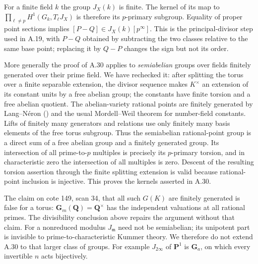 For a finite field $k$ the group $J_X(k)$ is finite. The kernel
of its map to $\prod_{\ell\ne p}H^1(G_k,T_\ell J_X)$ is therefore
its $p$-primary subgroup. Equality of proper point sections
implies $[P-Q]\in J_X(k)[p^\infty]$. This is the principal-divisor
step used in A.19, with $P-Q$ obtained by subtracting the two
classes relative to the same base point; replacing it by $Q-P$
changes the sign but not its order.

More generally the proof of A.30 applies to \emph{semiabelian}
groups over fields finitely generated over their prime field.
We have rechecked it: after splitting the torus over a finite
separable extension, the divisor sequence makes $K^\times$
an extension of its constant units by a free abelian group;
the constants have finite torsion and a free abelian quotient.
The abelian-variety rational points are finitely generated by
Lang--N\'eron (\citealt[Theorem 2.1]{Conrad2006}) and the usual
Mordell--Weil theorem for number-field constants. Lifts of finitely
many generators and relations use only finitely many basis
elements of the free torus subgroup. Thus the semiabelian
rational-point group is a direct sum of a free abelian group
and a finitely generated group. Its intersection of all
prime-to-$p$ multiples is precisely its $p$-primary torsion,
and in characteristic zero the intersection of all multiples
is zero. Descent of the resulting torsion assertion through
the finite splitting extension is valid because rational-point
inclusion is injective. This proves the kernels asserted in A.30.

The claim on cote 149, scan 34, that all such $G(K)$ are finitely
generated is false for a torus: $\mathbf G_m(\mathbf Q)=\mathbf Q^\times$
has the independent valuations at all rational primes. The
divisibility conclusion above repairs the argument without that
claim. For a nonreduced modulus $J_{\mathfrak m}$ need not be
semiabelian; its unipotent part is invisible to prime-to-characteristic
Kummer theory. We therefore do not extend A.30 to that larger
class of groups. For example $J_{2\infty}$ of $\mathbf P^1$
is $\mathbf G_a$, on which every invertible $n$ acts bijectively.

